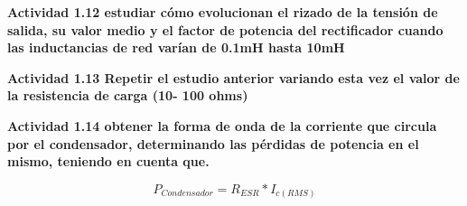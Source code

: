 ﻿\documentclass[letterpaper]{article}
\begin{document}
 \begin{large}

\textbf{Actividad 1.12 estudiar cómo evolucionan el rizado de la tensión de
salida, su valor medio y el factor de potencia del rectificador cuando
las inductancias de red varían de 0.1mH hasta 10mH }\end{large}
 \begin{large}

\textbf{Actividad 1.13 Repetir el estudio anterior variando esta vez el valor
de la resistencia de carga (10- 100 ohms)} \end{large}
 \begin{large}

\textbf{Actividad 1.14 obtener la forma de onda de la corriente que circula
por el condensador, determinando las pérdidas de potencia en el mismo,
teniendo en cuenta que.}\end{large}
 \begin{large}

\[
P_{Condensador}=R_{ESR}*I_{c(RMS)}
\]\end{large}
\end{document}
